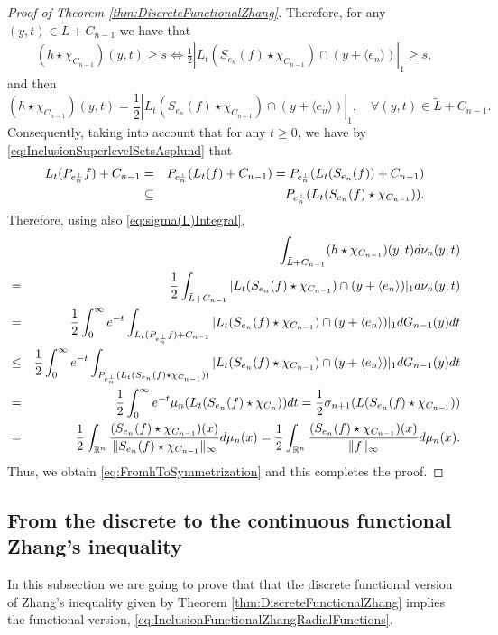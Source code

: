 \documentclass{amsart}
\newcommand{\R}{\mathbb R}
\theoremstyle{remark}
\theoremstyle{definition}
\numberwithin{equation}{section}
\begin{document}
\begin{proof}[Proof of Theorem \ref{thm:DiscreteFunctionalZhang}]
Therefore, for any $(y,t)\in \tilde{L}+C_{n-1}$ we have that
\begin{eqnarray*}
(h\star\chi_{C_{n-1}})(y,t)\geq s\Leftrightarrow\frac{1}{2}|L_t(S_{e_n}(f)\star\chi_{C_{n-1}})\cap (y+\langle e_n\rangle)|_1\geq s,
\end{eqnarray*}
and then
$$
(h\star\chi_{C_{n-1}})(y,t)=\frac{1}{2}|L_t(S_{e_n}(f)\star\chi_{C_{n-1}})\cap (y+\langle e_n\rangle)|_1,\quad\forall (y,t)\in \tilde{L}+C_{n-1}.
$$
Consequently, taking into account that for any $t\geq 0$,  we have by \eqref{eq:InclusionSuperlevelSetsAsplund} that
\begin{eqnarray*}
L_t(P_{e_n^\perp}f)+C_{n-1}&=&P_{e_n^\perp}(L_t(f)+C_{n-1})=P_{e_n^\perp}(L_t(S_{e_n}(f))+C_{n-1})\cr
&\subseteq& P_{e_n^\perp}(L_t(S_{e_n}(f)\star\chi_{C_{n-1}})).
\end{eqnarray*}
Therefore, using also \eqref{eq:sigma(L)Integral},
\begin{eqnarray*}
&&\int_{\tilde{L}+C_{n-1}} (h\star\chi_{C_{n-1}})(y,t)d\nu_n(y,t)\cr
&=&\frac{1}{2}\int_{\tilde{L}+C_{n-1}} |L_t(S_{e_n}(f)\star\chi_{C_{n-1}})\cap (y+\langle e_n\rangle)|_1d\nu_n(y,t)\cr
&=&\frac{1}{2}\int_0^\infty e^{-t}\int_{L_t(P_{e_n^\perp}f)+C_{n-1}}|L_t(S_{e_n}(f)\star\chi_{C_{n-1}})\cap (y+\langle e_n\rangle)|_1 dG_{n-1}(y)dt\cr
&\leq&\frac{1}{2}\int_0^\infty e^{-t}\int_{P_{e_n^\perp}(L_t(S_{e_n}(f)\star\chi_{C_{n-1}}))}|L_t(S_{e_n}(f)\star\chi_{C_{n-1}})\cap (y+\langle e_n\rangle)|_1 dG_{n-1}(y)dt\cr
&=&\frac{1}{2}\int_0^\infty e^{-t}\mu_n(L_t(S_{e_n}(f)\star\chi_{C_n}))dt=\frac{1}{2}\sigma_{n+1}(L(S_{e_n}(f)\star\chi_{C_{n-1}}))\cr
&=&\frac{1}{2}\int_{\R^n}\frac{(S_{e_n}(f)\star\chi_{C_{n-1}})(x)}{\Vert S_{e_n}(f)\star\chi_{C_{n-1}}\Vert_\infty}d\mu_n(x)=\frac{1}{2}\int_{\R^n}\frac{(S_{e_n}(f)\star\chi_{C_{n-1}})(x)}{\Vert f\Vert_\infty}d\mu_n(x).
\end{eqnarray*}
Thus, we obtain \eqref{eq:FromhToSymmetrization} and this completes the proof.
\end{proof}

\subsection{From the discrete to the continuous functional Zhang's inequality}

In this subsection we are going to prove that that the discrete functional version of Zhang's inequality given by Theorem \ref{thm:DiscreteFunctionalZhang} implies the functional version, \eqref{eq:InclusionFunctionalZhangRadialFunctions}.
\end{document}
